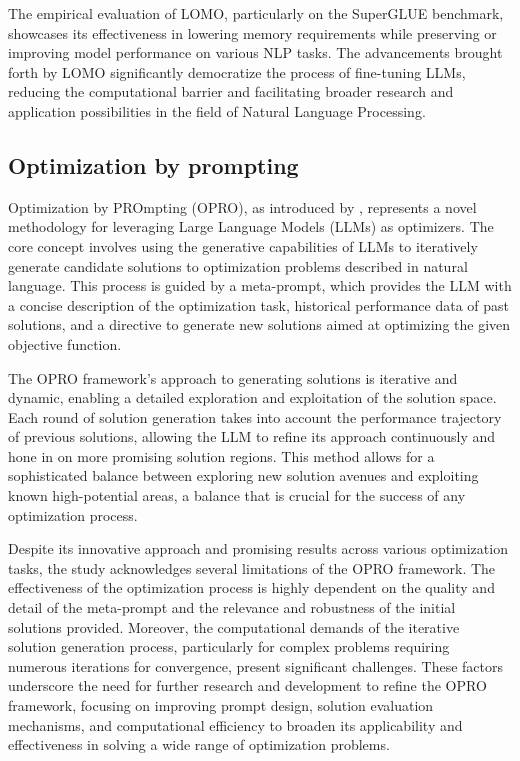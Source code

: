         The empirical evaluation of LOMO, particularly on the SuperGLUE benchmark, showcases its effectiveness in lowering memory requirements while preserving or improving model performance on various NLP tasks. The advancements brought forth by LOMO significantly democratize the process of fine-tuning LLMs, reducing the computational barrier and facilitating broader research and application possibilities in the field of Natural Language Processing.

    \subsection{Optimization by prompting}
        Optimization by PROmpting (OPRO), as introduced by \cite{yang2023large}, represents a novel methodology for leveraging Large Language Models (LLMs) as optimizers. The core concept involves using the generative capabilities of LLMs to iteratively generate candidate solutions to optimization problems described in natural language. This process is guided by a meta-prompt, which provides the LLM with a concise description of the optimization task, historical performance data of past solutions, and a directive to generate new solutions aimed at optimizing the given objective function.
        
        The OPRO framework's approach to generating solutions is iterative and dynamic, enabling a detailed exploration and exploitation of the solution space. Each round of solution generation takes into account the performance trajectory of previous solutions, allowing the LLM to refine its approach continuously and hone in on more promising solution regions. This method allows for a sophisticated balance between exploring new solution avenues and exploiting known high-potential areas, a balance that is crucial for the success of any optimization process.
        
        Despite its innovative approach and promising results across various optimization tasks, the study acknowledges several limitations of the OPRO framework. The effectiveness of the optimization process is highly dependent on the quality and detail of the meta-prompt and the relevance and robustness of the initial solutions provided. Moreover, the computational demands of the iterative solution generation process, particularly for complex problems requiring numerous iterations for convergence, present significant challenges. These factors underscore the need for further research and development to refine the OPRO framework, focusing on improving prompt design, solution evaluation mechanisms, and computational efficiency to broaden its applicability and effectiveness in solving a wide range of optimization problems.
        
